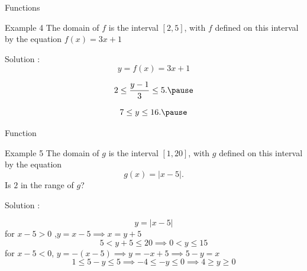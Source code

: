 \documentclass{beamer}
\begin{document}
\begin{frame}{Functions}
  \begin{exampleblock}{Example 4}
The domain of \(f\) is the interval \( [2, 5] \), with \(f\) defined on this interval by the equation \(f (x) = 3x + 1\)
  \end{exampleblock}
  Solution : \pause 
  \[
  y = f(x) = 3x+1 \]     \pause

  \[  2 \leq \frac{y-1}{3} \leq 5.  \pause
  \]

  \[  7 \leq y \leq 16.   \pause
   \]
\end{frame}

\begin{frame}{Function}
  \begin{exampleblock}{Example 5}
    The domain of \(g\) is the interval \([1,20]\), with \(g\) defined on this interval by
    the equation
    \[
    g(x) = |x - 5|.
    \]
    Is \(2\) in the range of \(g\)?
    
  \end{exampleblock}

  Solution :  \pause 

  \[ y =  |x-5| \]
  for \(x-5>0 \) ,\(y = x-5 \implies x = y+5 \)  
  \[ 5 < y+5 \leq 20  \implies  0 < y \leq 15 \]
  for \(x-5<0 \), \(y = -(x-5) \implies y = -x+5 \implies 5-y = x \)
  \[ 1 \leq 5-y \leq 5  \implies -4 \leq -y \leq 0 \implies  4 \geq y \geq 0 \] 

\end{frame}
\end{document}
